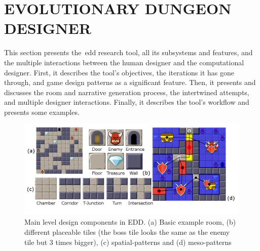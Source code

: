 \section[EVOLUTIONARY DUNGEON DESIGNER]{EVOLUTIONARY DUNGEON \\DESIGNER}
\label{sec:edd}
This section presents the~\acrfull{edd} research tool, all its subsystems and features, and the multiple interactions between the human designer and the computational designer. First, it describes the tool's objectives, the iterations it has gone through, and game design patterns as a significant feature. Then, it presents and discusses the room and narrative generation process, the intertwined attempts, and multiple designer interactions. Finally, it describes the tool's workflow and presents some examples.


\begin{figure}[!h]
\centerline{\includegraphics[width=\textwidth]{figures/EDD-figs/map-figure.png}}
\caption{Main level design components in EDD. (a) Basic example room, (b) different placeable tiles (the boss tile looks the same as the enemy tile but 3 times bigger), (c) spatial-patterns and (d) meso-patterns} \label{fig:tilesPats}
\end{figure}


